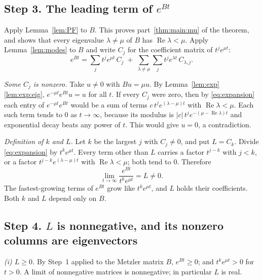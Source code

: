 \documentclass[11pt]{article}
\theoremstyle{definition}
\theoremstyle{remark}
\renewcommand{\Re}{\operatorname{Re}}
\begin{document}
\subsection*{Step 3. The leading term of $e^{Bt}$}

Apply Lemma~\ref{lem:PF} to $B$. This proves part~\ref{thm:main:mu} of the theorem, and shows that
every eigenvalue $\lambda \ne \mu$ of $B$ has $\Re\lambda < \mu$. Apply Lemma~\ref{lem:modes} to
$B$ and write $C_j$ for the coefficient matrix of $t^{j} e^{\mu t}$:
\begin{equation}\label{eq:expansion}
  e^{Bt} = \sum_{j} t^{j} e^{\mu t}\, C_j
  \;+\; \sum_{\lambda \ne \mu} \sum_{j} t^{j} e^{\lambda t}\, C_{\lambda,j} .
\end{equation}

\emph{Some $C_j$ is nonzero.} Take $u \ne 0$ with $Bu = \mu u$. By
Lemma~\ref{lem:exp}\ref{lem:exp:eig}, $e^{-\mu t} e^{Bt} u = u$ for all $t$. If every $C_j$ were
zero, then by \eqref{eq:expansion} each entry of $e^{-\mu t} e^{Bt}$ would be a sum of terms
$c\, t^{j} e^{(\lambda - \mu)t}$ with $\Re\lambda < \mu$. Each such term tends to $0$ as
$t \to \infty$, because its modulus is $|c|\, t^{j} e^{-(\mu - \Re\lambda)t}$ and exponential decay
beats any power of $t$. This would give $u = 0$, a contradiction.

\emph{Definition of $k$ and $L$.} Let $k$ be the largest $j$ with $C_j \ne 0$, and put $L = C_k$.
Divide \eqref{eq:expansion} by $t^{k} e^{\mu t}$. Every term other than $L$ carries a factor
$t^{j-k}$ with $j < k$, or a factor $t^{j-k} e^{(\lambda - \mu)t}$ with $\Re\lambda < \mu$; both
tend to $0$. Therefore
\begin{equation}\label{eq:L}
  \lim_{t \to \infty} \frac{e^{Bt}}{t^{k} e^{\mu t}} = L \ne 0 .
\end{equation}
The fastest-growing terms of $e^{Bt}$ grow like $t^{k} e^{\mu t}$, and $L$ holds their
coefficients. Both $k$ and $L$ depend only on $B$.

\subsection*{Step 4. $L$ is nonnegative, and its nonzero columns are eigenvectors}

\emph{\textup{(i)} $L \ge 0$.} By Step~1 applied to the Metzler matrix $B$, $e^{Bt} \ge 0$; and
$t^{k} e^{\mu t} > 0$ for $t > 0$. A limit of nonnegative matrices is nonnegative; in particular
$L$ is real.
\end{document}
